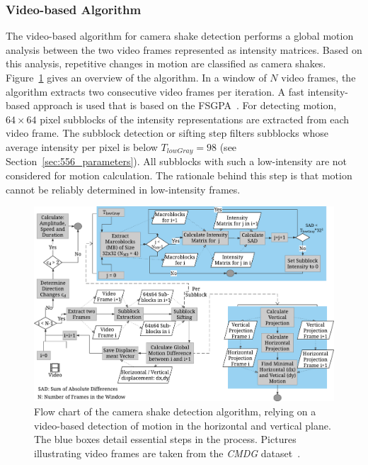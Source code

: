\subsubsection{Video-based Algorithm}
The video-based algorithm for camera shake detection performs a global motion analysis between the two video frames represented as intensity matrices.
Based on this analysis, repetitive changes in motion are classified as camera shakes.
Figure~\ref{fig:554_CSAlgorithm} gives an overview of the algorithm.
In a window of $N$ video frames, the algorithm extracts two consecutive video frames per iteration.
A fast intensity-based approach is used that is based on the \ac{FSGPA}~\cite{Hao2013}.
For detecting motion, $64\times64$ pixel subblocks of the intensity representations are extracted from each video frame.
The subblock detection or sifting step filters subblocks whose average intensity per pixel is below $T_{lowGray} = 98$ (see Section~\ref{sec:556_parameters}). 
All subblocks with such a low-intensity are not considered for motion calculation.
The rationale behind this step is that motion cannot be reliably determined in low-intensity frames.
 \begin{figure}[!htb]
 	\centering
 	\includegraphics[width=\linewidth]{./gfx/550_QA/Camera_shake_algorithm_Video_based}
 	\caption[Flow chart of the video-based camera shake detection algorithm]{Flow chart of the camera shake detection algorithm, relying on a video-based detection of motion in the horizontal and vertical plane. The blue boxes detail essential steps in the process. Pictures illustrating video frames are taken from the \textit{CMDG} dataset~\cite{Bano2015}.}
 	\label{fig:554_CSAlgorithm}
 \end{figure}
 
